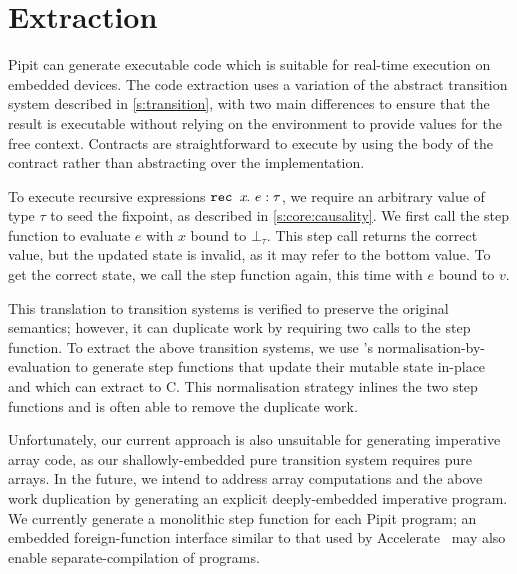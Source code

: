 

\section{Extraction}
\label{s:extraction}

Pipit can generate executable code which is suitable for real-time execution on embedded devices.
The code extraction uses a variation of the abstract transition system described in \autoref{s:transition}, with two main differences to ensure that the result is executable without relying on the environment to provide values for the free context.
Contracts are straightforward to execute by using the body of the contract rather than abstracting over the implementation.

To execute recursive expressions $\texttt{rec~} x\hspace{-0.1em}.~e : \tau$, we require an arbitrary value of type $\tau$ to seed the fixpoint, as described in \autoref{s:core:causality}.
We first call the step function to evaluate $e$ with $x$ bound to $\bot_\tau$.
This step call returns the correct value, but the updated state is invalid, as it may refer to the bottom value.
To get the correct state, we call the step function again, this time with $e$ bound to $v$.

This translation to transition systems is verified to preserve the original semantics; however, it can duplicate work by requiring two calls to the step function.
To extract the above transition systems, we use \fstar{}'s normalisation-by-evaluation to generate step functions that update their mutable state in-place and which \lowstar{} can extract to C.
This normalisation strategy inlines the two step functions and is often able to remove the duplicate work.

Unfortunately, our current approach is also unsuitable for generating imperative array code, as our shallowly-embedded pure transition system requires pure arrays.
In the future, we intend to address array computations and the above work duplication by generating an explicit deeply-embedded imperative program.
We currently generate a monolithic step function for each Pipit program; an embedded foreign-function interface similar to that used by Accelerate~\cite{clifton2014embedding} may also enable separate-compilation of programs.

